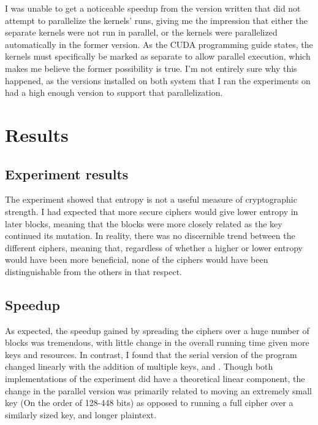 \documentclass[11.5pt]{article}
\begin{document}
I was unable to get a noticeable speedup from the version written that did not attempt to parallelize the kernels' runs, giving me the impression that either the separate kernels were not run in parallel, or the kernels were parallelized automatically in the former version. As the CUDA programming guide states, the kernels must specifically be marked as separate to allow parallel execution, which makes me believe the former possibility is true. I'm not entirely sure why this happened, as the versions installed on both system that I ran the experiments on had a high enough version to support that parallelization.

\section{Results}
\subsection*{Experiment results}
The experiment showed that entropy is not a useful measure of cryptographic strength. I had expected that more secure ciphers would give lower entropy in later blocks, meaning that the blocks were more closely related as the key continued its mutation. In reality, there was no discernible trend between the different ciphers, meaning that, regardless of whether a higher or lower entropy would have been more beneficial, none of the ciphers would have been distinguishable from the others in that respect.

\subsection*{Speedup}
As expected, the speedup gained by spreading the ciphers over a huge number of blocks was tremendous, with little change in the overall running time given more keys and resources. In contrast, I found that the serial version of the program changed linearly with the addition of multiple keys, and . Though both implementations of the experiment did have a theoretical linear component, the change in the parallel version was primarily related to moving an extremely small key (On the order of 128-448 bits) as opposed to running a full cipher over a similarly sized key, and longer plaintext.
\end{document}

